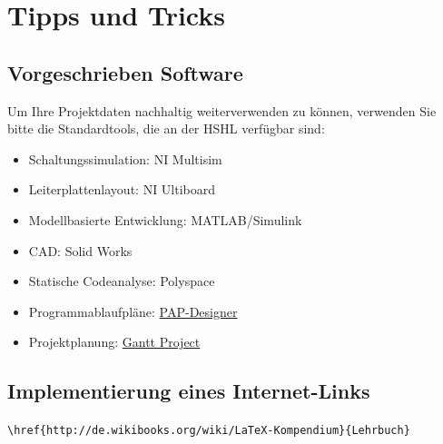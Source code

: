 \chapter{Tipps und Tricks}

\section{Vorgeschrieben Software}
Um Ihre Projektdaten nachhaltig weiterverwenden zu können, verwenden Sie bitte die Standardtools, die an der HSHL verfügbar sind:
\begin{itemize}
	\item Schaltungssimulation: NI Multisim
	\item Leiterplattenlayout: NI Ultiboard
	\item Modellbasierte Entwicklung: MATLAB/Simulink
	\item CAD: Solid Works
	\item Statische Codeanalyse: Polyspace
	\item Programmablaufpläne: \href{https://www.heise.de/download/product/papdesigner-51889}{PAP-Designer}
	\item Projektplanung: \href{https://www.heise.de/download/product/ganttproject-25167}{Gantt Project}
\end{itemize}



\section{Implementierung eines Internet-Links}
\verb|\href{http://de.wikibooks.org/wiki/LaTeX-Kompendium}{Lehrbuch}|
